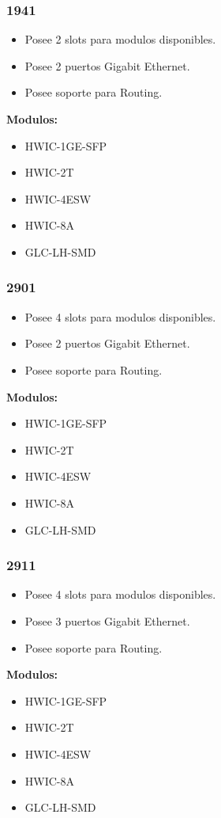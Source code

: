 \documentclass{article}
\begin{document}
\subsubsection{1941}
\begin{itemize}
    \item Posee 2 slots para modulos disponibles.
    \item Posee 2 puertos Gigabit Ethernet.
    \item Posee soporte para Routing.
\end{itemize}
\textbf{Modulos:}
\begin{itemize}
    \item HWIC-1GE-SFP
    \item HWIC-2T
    \item HWIC-4ESW
    \item HWIC-8A
    \item GLC-LH-SMD
\end{itemize}

\subsubsection{2901}
\begin{itemize}
    \item Posee 4 slots para modulos disponibles.
    \item Posee 2 puertos Gigabit Ethernet.
    \item Posee soporte para Routing.
\end{itemize}
\textbf{Modulos:}
\begin{itemize}
    \item HWIC-1GE-SFP
    \item HWIC-2T
    \item HWIC-4ESW
    \item HWIC-8A
    \item GLC-LH-SMD
\end{itemize}

\subsubsection{2911}
\begin{itemize}
    \item Posee 4 slots para modulos disponibles.
    \item Posee 3 puertos Gigabit Ethernet.
    \item Posee soporte para Routing.
\end{itemize}
\textbf{Modulos:}
\begin{itemize}
    \item HWIC-1GE-SFP
    \item HWIC-2T
    \item HWIC-4ESW
    \item HWIC-8A
    \item GLC-LH-SMD
\end{itemize}
\end{document}
